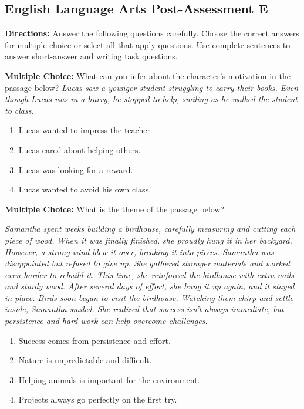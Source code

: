 \documentclass[12pt]{article}
\begin{document}
\subsection*{English Language Arts Post-Assessment E}
\onehalfspacing

\begin{tcolorbox}[colframe=black!50, colback=white, title=Assessment Directions]
\textbf{Directions:} Answer the following questions carefully. Choose the correct answers for multiple-choice or select-all-that-apply questions. Use complete sentences to answer short-answer and writing task questions.
\end{tcolorbox}

\begin{tcolorbox}[colframe=black!50, colback=white, title=Question 1]
\textbf{Multiple Choice:} What can you infer about the character’s motivation in the passage below?  
\textit{Lucas saw a younger student struggling to carry their books. Even though Lucas was in a hurry, he stopped to help, smiling as he walked the student to class.}  
\begin{enumerate}[label=(\Alph*)]
\item Lucas wanted to impress the teacher.  
\item Lucas cared about helping others.  
\item Lucas was looking for a reward.  
\item Lucas wanted to avoid his own class.  
\end{enumerate}
\end{tcolorbox}

\begin{tcolorbox}[colframe=black!50, colback=white, title=Question 2]
\textbf{Multiple Choice:} What is the theme of the passage below?  

\textit{Samantha spent weeks building a birdhouse, carefully measuring and cutting each piece of wood. When it was finally finished, she proudly hung it in her backyard. However, a strong wind blew it over, breaking it into pieces. Samantha was disappointed but refused to give up. She gathered stronger materials and worked even harder to rebuild it. This time, she reinforced the birdhouse with extra nails and sturdy wood. After several days of effort, she hung it up again, and it stayed in place. Birds soon began to visit the birdhouse. Watching them chirp and settle inside, Samantha smiled. She realized that success isn’t always immediate, but persistence and hard work can help overcome challenges.}

\begin{enumerate}[label=(\Alph*)]
\item Success comes from persistence and effort.  
\item Nature is unpredictable and difficult.  
\item Helping animals is important for the environment.  
\item Projects always go perfectly on the first try.  
\end{enumerate}
\end{tcolorbox}
\end{document}
